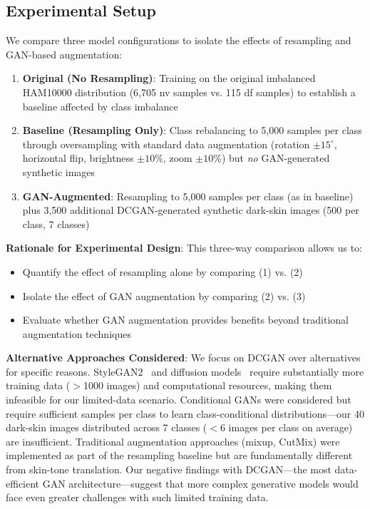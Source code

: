 \documentclass[10pt, twocolumn, letterpaper]{article}
\begin{document}
\subsection{Experimental Setup}
We compare three model configurations to isolate the effects of resampling and GAN-based augmentation:
\begin{enumerate}[leftmargin=*, itemsep=2pt]
    \item \textbf{Original (No Resampling)}: Training on the original imbalanced HAM10000 distribution (6,705 nv samples vs. 115 df samples) to establish a baseline affected by class imbalance
    \item \textbf{Baseline (Resampling Only)}: Class rebalancing to 5,000 samples per class through oversampling with standard data augmentation (rotation $\pm15^\circ$, horizontal flip, brightness $\pm10\%$, zoom $\pm10\%$) but \textit{no} GAN-generated synthetic images
    \item \textbf{GAN-Augmented}: Resampling to 5,000 samples per class (as in baseline) plus 3,500 additional DCGAN-generated synthetic dark-skin images (500 per class, 7 classes)
\end{enumerate}

\textbf{Rationale for Experimental Design}: This three-way comparison allows us to:
\begin{itemize}[leftmargin=*, itemsep=2pt]
    \item Quantify the effect of resampling alone by comparing (1) vs. (2)
    \item Isolate the effect of GAN augmentation by comparing (2) vs. (3)
    \item Evaluate whether GAN augmentation provides benefits beyond traditional augmentation techniques
\end{itemize}

\textbf{Alternative Approaches Considered}: We focus on DCGAN over alternatives for specific reasons. StyleGAN2~\cite{karras2020} and diffusion models~\cite{ho2020} require substantially more training data ($>$1000 images) and computational resources, making them infeasible for our limited-data scenario. Conditional GANs were considered but require sufficient samples per class to learn class-conditional distributions—our 40 dark-skin images distributed across 7 classes ($<$6 images per class on average) are insufficient. Traditional augmentation approaches (mixup, CutMix) were implemented as part of the resampling baseline but are fundamentally different from skin-tone translation. Our negative findings with DCGAN—the most data-efficient GAN architecture—suggest that more complex generative models would face even greater challenges with such limited training data.
\end{document}
